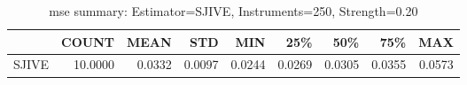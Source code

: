 \begin{table}[ht]
\centering
\caption{mse summary: Estimator=SJIVE, Instruments=250, Strength=0.20}
\begin{tabular}{lrrrrrrrr}
\toprule
 & COUNT & MEAN & STD & MIN & 25\% & 50\% & 75\% & MAX \\
\midrule
SJIVE & 10.0000 & 0.0332 & 0.0097 & 0.0244 & 0.0269 & 0.0305 & 0.0355 & 0.0573 \\
\bottomrule
\end{tabular}
\end{table}
